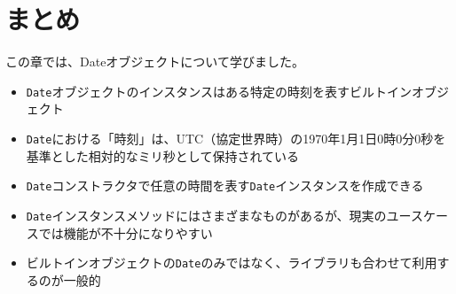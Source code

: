 \hypertarget{conclusion}{%
\section{まとめ}\label{conclusion}}

この章では、Dateオブジェクトについて学びました。

\begin{itemize}
\item
  \texttt{Date}オブジェクトのインスタンスはある特定の時刻を表すビルトインオブジェクト
\item
  \texttt{Date}における「時刻」は、UTC（協定世界時）の1970年1月1日0時0分0秒を基準とした相対的なミリ秒として保持されている
\item
  \texttt{Date}コンストラクタで任意の時間を表す\texttt{Date}インスタンスを作成できる
\item
  \texttt{Date}インスタンスメソッドにはさまざまなものがあるが、現実のユースケースでは機能が不十分になりやすい
\item
  ビルトインオブジェクトの\texttt{Date}のみではなく、ライブラリも合わせて利用するのが一般的
\end{itemize}
